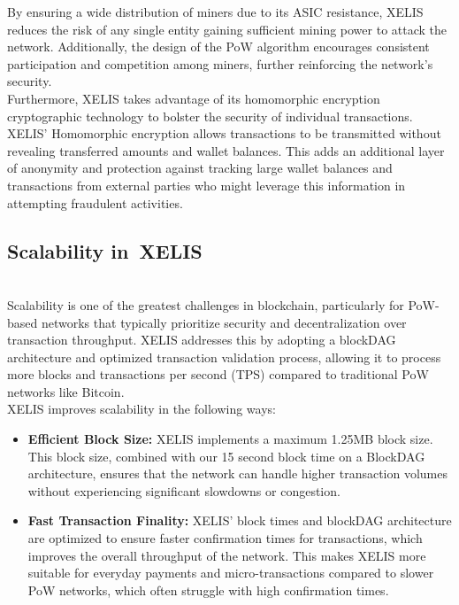 \documentclass[12pt,a4paper,twocolumn]{article}
\begin{document}
By ensuring a wide distribution of miners due to its ASIC resistance, XELIS reduces the risk of any single entity gaining sufficient mining power to attack the network. Additionally, the design of the PoW algorithm encourages consistent participation and competition among miners, further reinforcing the network's security.\\

Furthermore, XELIS takes advantage of its homomorphic encryption cryptographic technology to bolster the security of individual transactions. XELIS' Homomorphic encryption allows transactions to be transmitted without revealing transferred amounts and wallet balances. This adds an additional layer of anonymity and protection against tracking large wallet balances and transactions from external parties who might leverage this information in attempting fraudulent activities.\\


\subsection{Scalability in XELIS}\\

Scalability is one of the greatest challenges in blockchain, particularly for PoW-based networks that typically prioritize security and decentralization over transaction throughput. XELIS addresses this by adopting a blockDAG architecture and optimized transaction validation process, allowing it to process more blocks and transactions per second (TPS) compared to traditional PoW networks like Bitcoin.\\

XELIS improves scalability in the following ways:
\begin{itemize}
    \item \textbf{Efficient Block Size:} XELIS implements a maximum 1.25MB block size. This block size, combined with our 15 second block time on a BlockDAG architecture, ensures that the network can handle higher transaction volumes without experiencing significant slowdowns or congestion.
    \item \textbf{Fast Transaction Finality:} XELIS' block times and blockDAG architecture are optimized to ensure faster confirmation times for transactions, which improves the overall throughput of the network. This makes XELIS more suitable for everyday payments and micro-transactions compared to slower PoW networks, which often struggle with high confirmation times.
\end{itemize}
\end{document}
